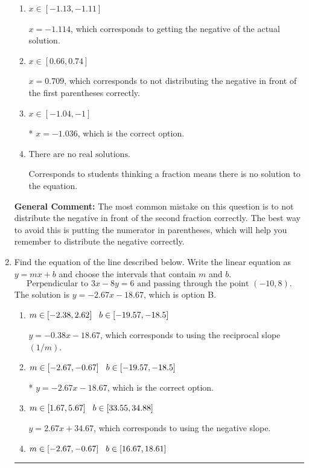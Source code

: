 \documentclass{extbook}[14pt]
\newcommand{\litem}[1]{\item #1

\rule{\textwidth}{0.4pt}}
\begin{document}
\begin{enumerate}
{\begin{enumerate}[label=\Alph*.]
$x = -0.709$, which corresponds to not distributing the negative in front of the second parentheses correctly.
\item \( x \in [-1.13, -1.11] \)

$x = -1.114$, which corresponds to getting the negative of the actual solution.
\item \( x \in [0.66, 0.74] \)

$x = 0.709$, which corresponds to not distributing the negative in front of the first parentheses correctly.
\item \( x \in [-1.04, -1] \)

* $x = -1.036$, which is the correct option.
\item \( \text{There are no real solutions.} \)

Corresponds to students thinking a fraction means there is no solution to the equation.
\end{enumerate}

\textbf{General Comment:} The most common mistake on this question is to not distribute the negative in front of the second fraction correctly. The best way to avoid this is putting the numerator in parentheses, which will help you remember to distribute the negative correctly.
}
\litem{
Find the equation of the line described below. Write the linear equation as $ y=mx+b $ and choose the intervals that contain $m$ and $b$.
\[ \text{Perpendicular to } 3 x - 8 y = 6 \text{ and passing through the point } (-10, 8). \]The solution is \( y = -2.67x - 18.67 \), which is option B.\begin{enumerate}[label=\Alph*.]
\item \( m \in [-2.38, 2.62] \hspace*{3mm} b \in [-19.57, -18.5] \)

 $y = -0.38x - 18.67$, which corresponds to using the reciprocal slope $(1/m)$.
\item \( m \in [-2.67, -0.67] \hspace*{3mm} b \in [-19.57, -18.5] \)

* $y = -2.67x - 18.67$, which is the correct option.
\item \( m \in [1.67, 5.67] \hspace*{3mm} b \in [33.55, 34.88] \)

 $y = 2.67x + 34.67$, which corresponds to using the negative slope.
\item \( m \in [-2.67, -0.67] \hspace*{3mm} b \in [16.67, 18.61] \)


\end{enumerate}}
\end{enumerate}
\end{document}
